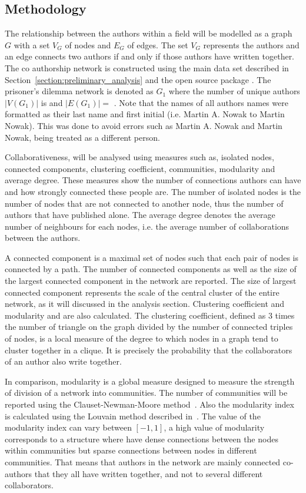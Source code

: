 \documentclass{article}
\theoremstyle{definition}
\newcommand{\authors}{}
\newcommand{\edges}{}
\begin{document}
\subsection{Methodology}\label{section:methodology}

The relationship between the authors within a field will be modelled as a graph \(G\) with
a set \(V_G\) of nodes and \(E_G\) of edges. The set \(V_G\) represents the authors
and an edge connects two authors if and only if those authors have written together.
The co authorship network is constructed using the main data set described in
Section~\ref{section:preliminary_analysis} and the open source package
\cite{networkx}. The prisoner's dilemma network is denoted as \(G_1\) where the
number of unique authors \(|V(G_1)|\) is \authors and \(|E(G_1)|=\) \edges.
Note that the names of all authors names were formatted as their last name and
first initial (i.e. Martin A. Nowak to Martin Nowak). This was done to avoid errors
such as Martin A. Nowak and Martin Nowak, being treated as a different person.

Collaborativeness, will be analysed using measures such as, isolated nodes,
connected components, clustering coefficient, communities, modularity and average degree.
These measures show the number of connections authors can have
and how strongly connected these people are. The number of isolated nodes is the
number of nodes that are not connected to another node, thus the
number of authors that have published alone. The average degree denotes the average
number of neighbours for each nodes, i.e. the average number of collaborations
between the authors.

A connected component is a maximal set of nodes such that each pair of nodes is
connected by a path. The number of connected components as well as the size of the
largest connected component in the network are reported.
The size of largest connected component represents the scale of the central cluster
of the entire network, as it will discussed in the analysis section.
Clustering coefficient and modularity and are also calculated. The clustering
coefficient, defined as 3 times the number of triangle on the graph divided
by the number of connected triples of nodes, is a local measure of the degree to
which nodes in a graph tend to cluster together
in a clique. It is precisely the probability that the collaborators
of an author also write together.

In comparison, modularity is a global measure designed to measure the strength of
division of a network into communities. The number of communities will be reported
using the Clauset-Newman-Moore method~\cite{clauset2004}. Also the modularity index
is calculated using the Louvain method described in~\cite{Blondel2008}. The value
of the modularity index can vary between \([-1, 1]\), a high value of modularity
corresponds to a structure where have dense connections between the nodes within
communities but sparse connections between nodes in different communities.
That means that authors in the network are mainly connected co-authors that they
all have written together, and not to several different collaborators.
\end{document}
